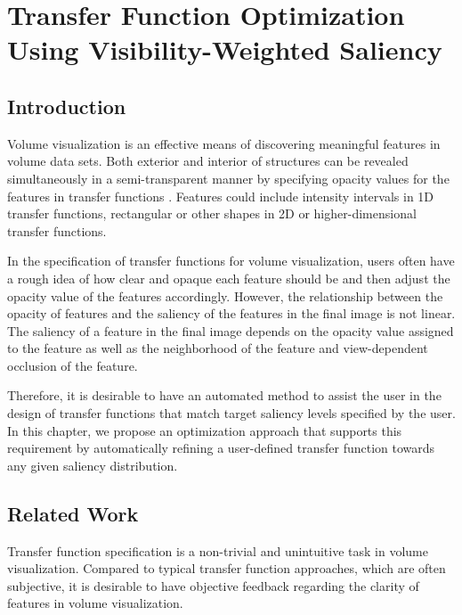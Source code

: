 \chapter{Transfer Function Optimization Using Visibility-Weighted Saliency \label{transfer_function_optimization}}

\section{Introduction}
Volume visualization is an effective means of discovering meaningful features in volume data sets.
Both exterior and interior of structures can be revealed simultaneously in a semi-transparent manner by specifying opacity values for the features in transfer functions \cite{wang_efficient_2011}.
Features could include intensity intervals in 1D transfer functions, rectangular or other shapes in 2D or higher-dimensional transfer functions.

In the specification of transfer functions for volume visualization, users often have a rough idea of how clear and opaque each feature should be and then adjust the opacity value of the features accordingly.
However, the relationship between the opacity of features and the saliency of the features in the final image is not linear.
The saliency of a feature in the final image depends on the opacity value assigned to the feature as well as the neighborhood of the feature and view-dependent occlusion of the feature.


Therefore, it is desirable to have an automated method to assist the user in the design of transfer functions that match target saliency levels specified by the user. In this chapter, we propose an optimization approach that supports this requirement by automatically refining a user-defined transfer function towards any given saliency distribution. 

\section{Related Work}
Transfer function specification is a non-trivial and unintuitive task in volume visualization. Compared to typical transfer function approaches, which are often subjective, it is desirable to have objective feedback regarding the clarity of features in volume visualization.

